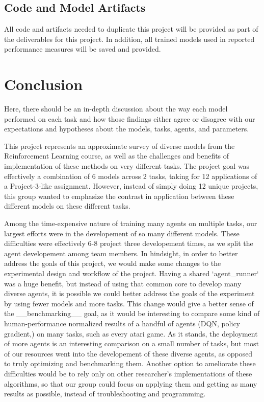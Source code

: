 \documentclass[conference]{IEEEtran}
\begin{document}
\subsection{Code and Model Artifacts}
All code and artifacts needed to duplicate this project will be provided as part of the deliverables for this project.
In addition, all trained models used in reported performance measures will be saved and provided.

\section{Conclusion} \label{conclusion}
Here, there should be an in-depth discussion about the way each model performed on each task and how those findings either agree or disagree with our expectations and hypotheses about the models, tasks, agents, and parameters.

This project represents an approximate survey of diverse models from the Reinforcement Learning course, as well as the challenges and benefits of implementation of these methods on very different tasks. The project goal was effectively a combination of 6 models across 2 tasks, taking for 12 applications of a Project-3-like assignment. However, instead of simply doing 12 unique projects, this group wanted to emphasize the contrast in application between these different models on these different tasks.

Among the time-expensive nature of training many agents on multiple tasks, our largest efforts were in the developement of so many different models. These difficulties were effectively 6-8 project three developement times, as we split the agent developement among team members. In hindsight, in order to better address the goals of this project, we would make some changes to the experimental design and workflow of the project. Having a shared `agent_runner` was a huge benefit, but instead of using that common core to develop many diverse agents, it is possible we could better address the goals of the experiment by using fewer models and more tasks. This change would give a better sense of the __benchmarking__ goal, as it would be interesting to compare some kind of human-performance normalized results of a handful of agents (DQN, policy gradient,) on many tasks, such as every atari game. As it stands, the deployment of more agents is an interesting comparison on a small number of tasks, but most of our resources went into the developement of these diverse agents, as opposed to truly optimizing and benchmarking them. Another option to ameliorate these difficulties would be to rely only on other researcher's implementations of these algorithms, so that our group could focus on applying them and getting as many results as possible, instead of troubleshooting and programming.

{}


\vspace{12pt}
\end{document}
